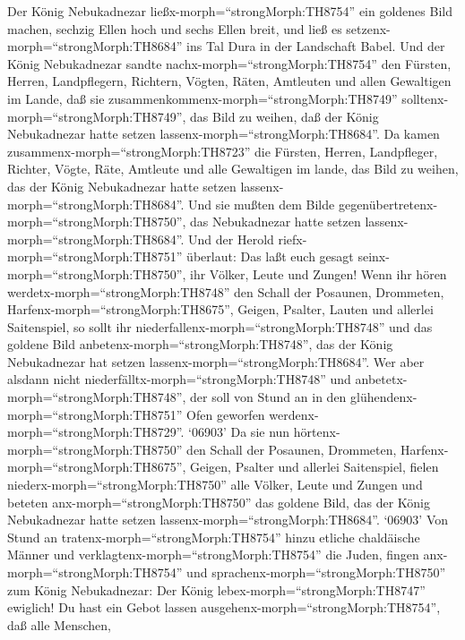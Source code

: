  Der König Nebukadnezar ließx-morph=``strongMorph:TH8754''
ein goldenes Bild machen, sechzig Ellen hoch und sechs Ellen breit, und
ließ es setzenx-morph=``strongMorph:TH8684'' ins Tal Dura in der
Landschaft Babel.  Und der König Nebukadnezar sandte
nachx-morph=``strongMorph:TH8754'' den Fürsten, Herren, Landpflegern,
Richtern, Vögten, Räten, Amtleuten und allen Gewaltigen im Lande, daß
sie zusammenkommenx-morph=``strongMorph:TH8749''
solltenx-morph=``strongMorph:TH8749'', das Bild zu weihen, daß der König
Nebukadnezar hatte setzen lassenx-morph=``strongMorph:TH8684''.
 Da kamen zusammenx-morph=``strongMorph:TH8723'' die
Fürsten, Herren, Landpfleger, Richter, Vögte, Räte, Amtleute und alle
Gewaltigen im lande, das Bild zu weihen, das der König Nebukadnezar
hatte setzen lassenx-morph=``strongMorph:TH8684''. Und sie mußten dem
Bilde gegenübertretenx-morph=``strongMorph:TH8750'', das Nebukadnezar
hatte setzen lassenx-morph=``strongMorph:TH8684''.  Und der
Herold riefx-morph=``strongMorph:TH8751'' überlaut: Das laßt euch gesagt
seinx-morph=``strongMorph:TH8750'', ihr Völker, Leute und Zungen!
 Wenn ihr hören werdetx-morph=``strongMorph:TH8748'' den
Schall der Posaunen, Drommeten, Harfenx-morph=``strongMorph:TH8675'',
Geigen, Psalter, Lauten und allerlei Saitenspiel, so sollt ihr
niederfallenx-morph=``strongMorph:TH8748'' und das goldene Bild
anbetenx-morph=``strongMorph:TH8748'', das der König Nebukadnezar hat
setzen lassenx-morph=``strongMorph:TH8684''.  Wer aber
alsdann nicht niederfälltx-morph=``strongMorph:TH8748'' und
anbetetx-morph=``strongMorph:TH8748'', der soll von Stund an in den
glühendenx-morph=``strongMorph:TH8751'' Ofen geworfen
werdenx-morph=``strongMorph:TH8729''.  `06903' Da sie nun
hörtenx-morph=``strongMorph:TH8750'' den Schall der Posaunen, Drommeten,
Harfenx-morph=``strongMorph:TH8675'', Geigen, Psalter und allerlei
Saitenspiel, fielen niederx-morph=``strongMorph:TH8750'' alle Völker,
Leute und Zungen und beteten anx-morph=``strongMorph:TH8750'' das
goldene Bild, das der König Nebukadnezar hatte setzen
lassenx-morph=``strongMorph:TH8684''.  `06903' Von Stund an
tratenx-morph=``strongMorph:TH8754'' hinzu etliche chaldäische Männer
und verklagtenx-morph=``strongMorph:TH8754'' die Juden, 
fingen anx-morph=``strongMorph:TH8754'' und
sprachenx-morph=``strongMorph:TH8750'' zum König Nebukadnezar: Der König
lebex-morph=``strongMorph:TH8747'' ewiglich!  Du hast ein
Gebot lassen ausgehenx-morph=``strongMorph:TH8754'', daß alle Menschen,
